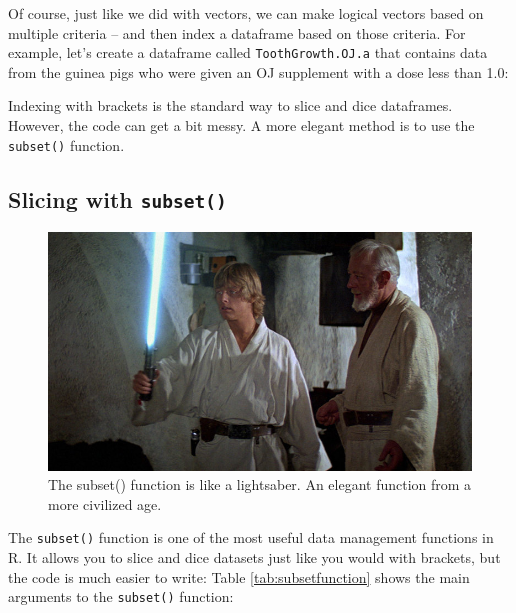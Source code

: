 \documentclass[]{book}
\newenvironment{Shaded}{\begin{snugshade}}{\end{snugshade}}
\newcommand{\DecValTok}[1]{\textcolor[rgb]{0.00,0.00,0.81}{#1}}
\newcommand{\StringTok}[1]{\textcolor[rgb]{0.31,0.60,0.02}{#1}}
\newcommand{\CommentTok}[1]{\textcolor[rgb]{0.56,0.35,0.01}{\textit{#1}}}
\newcommand{\OperatorTok}[1]{\textcolor[rgb]{0.81,0.36,0.00}{\textbf{#1}}}
\newcommand{\NormalTok}[1]{#1}
\theoremstyle{definition}
\theoremstyle{definition}
\theoremstyle{remark}
\begin{document}
Of course, just like we did with vectors, we can make logical vectors
based on multiple criteria -- and then index a dataframe based on those
criteria. For example, let's create a dataframe called
\texttt{ToothGrowth.OJ.a} that contains data from the guinea pigs who
were given an OJ supplement with a dose less than 1.0:

\begin{Shaded}
\end{Shaded}

Indexing with brackets is the standard way to slice and dice dataframes.
However, the code can get a bit messy. A more elegant method is to use
the \texttt{subset()} function.

\subsection{\texorpdfstring{Slicing with
\texttt{subset()}}{Slicing with subset()}}\label{slicing-with-subset}

\begin{figure}

{\centering \includegraphics[width=0.5\linewidth]{images/saber} 

}

\caption{The subset() function is like a lightsaber. An elegant function from a more civilized age.}\label{fig:unnamed-chunk-217}
\end{figure}

The \texttt{subset()} function is one of the most useful data management
functions in R. It allows you to slice and dice datasets just like you
would with brackets, but the code is much easier to write: Table
\ref{tab:subsetfunction} shows the main arguments to the
\texttt{subset()} function:
\end{document}
